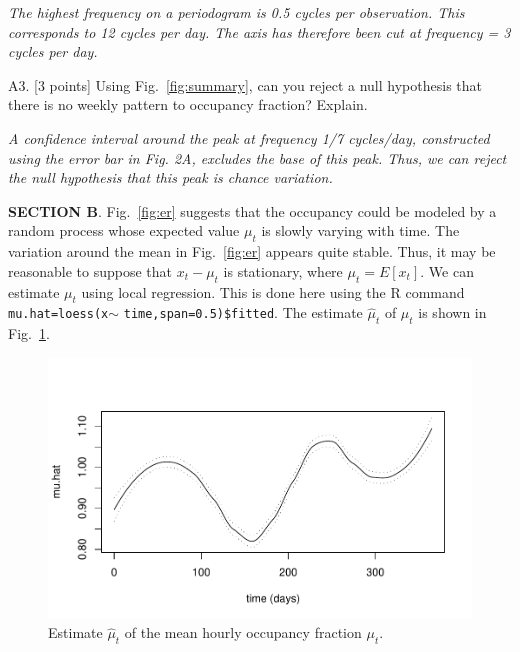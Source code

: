 \documentclass[11pt]{article}
\def\bc{\begin{center}}
\def\ec{\end{center}}
\def\qskip{\vspace{0in}}
\begin{document}
{\it The highest frequency on a periodogram is 0.5 cycles per
observation. This corresponds to 12 cycles per day. The axis has
therefore been cut at frequency = 3 cycles per day.}


A3. [3 points] Using Fig.~\ref{fig:summary}, can you reject a null
hypothesis that there is no weekly pattern to occupancy fraction?
Explain.

{\it A confidence interval around the peak at frequency 1/7 cycles/day,
constructed using the error bar in Fig. 2A, excludes the base of
this peak. Thus, we can reject the null hypothesis that this peak is
chance variation.}

\qskip


{\bf SECTION B}.
Fig.~\ref{fig:er} suggests that the occupancy could be modeled by a random process whose expected value $\mu_t$ is slowly varying with time.
The variation around the mean in  Fig.~\ref{fig:er} appears quite stable.
 Thus, it may be reasonable to suppose that $x_t-\mu_t$ is stationary, where $\mu_t=E[x_t]$.
We can estimate $\mu_t$ %
using local regression. This is done here using the R command \texttt{mu.hat=loess(x}$ \sim$ \texttt{time,span=0.5)\$fitted}. The estimate $\hat \mu_t$ of $\mu_t$ is shown in Fig.~\ref{fig:smo}.
\begin{figure}[h]
\bc
\vspace{-1cm}
\includegraphics[width=4.5in]{ER-um-smo}
\vspace{-1cm}
\ec
\caption{Estimate $\hat\mu_t$ of the mean hourly occupancy fraction $\mu_t$.}\label{fig:smo}
\end{figure}
\end{document}
